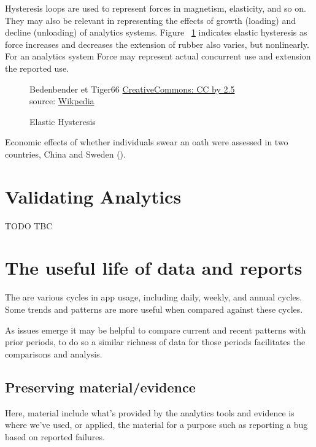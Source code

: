 Hysteresis loops are used to represent forces in magnetism, elasticity, and so on. They may also be relevant in representing the effects of growth (loading) and decline (unloading) of analytics systems. Figure ~\ref{fig:elastic-hysteresis} indicates elastic hysteresis as force increases and decreases the extension of rubber also varies, but nonlinearly. For an analytics system Force may represent actual concurrent use and extension the reported use.

\begin{figure}[!htbp]
    \centering
    \copyrightbox[r]{
        }
    {\textcopyright Bedenbender et Tiger66 \href{{https://creativecommons.org/licenses/by/2.5}}{CreativeCommons: CC by 2.5}\\source: \href{https://commons.wikimedia.org/wiki/File:Elastic_Hysteresis.svg}{Wikpedia}}
    \caption{Elastic Hysteresis}
    \label{fig:elastic-hysteresis}
\end{figure}

Economic effects of whether individuals swear an oath were assessed in two countries, China and Sweden (\cite{carlsson2013truth}). 


\section{Validating Analytics}

TODO TBC

\section{The useful life of data and reports}
The are various cycles in app usage, including daily, weekly, and annual cycles. Some trends and patterns are more useful when compared against these cycles. 

As issues emerge it may be helpful to compare current and recent patterns with prior periods, to do so a similar richness of data for those periods facilitates the comparisons and analysis.

\subsection{Preserving material/evidence}
Here, material include what's provided by the analytics tools and evidence is where we've used, or applied, the material for a purpose such as reporting a bug based on reported failures.

